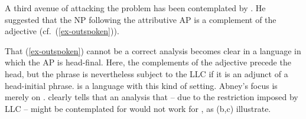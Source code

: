 \documentclass[output=paper
  ,nobabel
  ,uniformtopskip %
]{langscibook}
\begin{document}
A third avenue of attacking the problem has been contemplated by \citet*[339]{Abney87a}. He suggested that the NP following the attributive AP is a complement of the adjective (cf.\ (\ref{ex-outspoken})).

\eal
{}\label{ex-outspoken}


\label{ex-sicher}

\label{ex-proposal}
\zl

\noindent
That (\ref{ex-outspoken}) cannot be a correct analysis becomes clear in a language in which the AP is head-final. Here, the complements of the adjective precede the head, but the phrase is nevertheless subject to the LLC if it is an adjunct of a head-initial phrase.  is a language with this kind of setting.  Abney's focus is merely on .  clearly tells that an analysis that – due to the restriction imposed by LLC – might be contemplated for  would not work for , as (b,c) illustrate.
\end{document}
